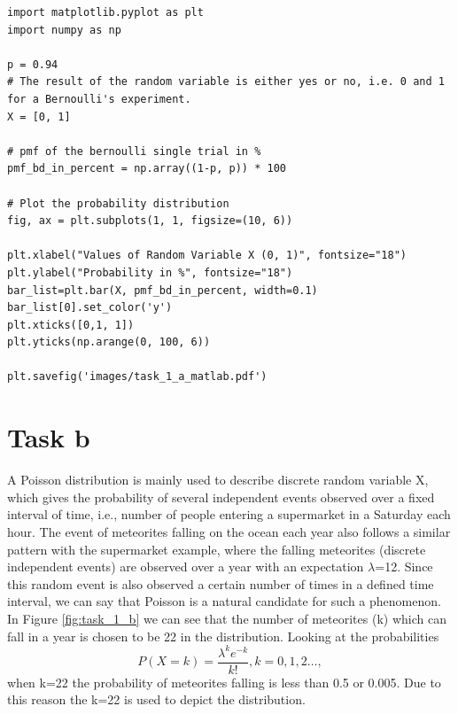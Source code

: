 \begin{lstlisting}[caption={: Plotting the PMF for representing Bernoulli’s single trial P (votes=for & votes = against)},label=code_task_1_a]
import matplotlib.pyplot as plt
import numpy as np

p = 0.94
# The result of the random variable is either yes or no, i.e. 0 and 1 for a Bernoulli's experiment.
X = [0, 1]

# pmf of the bernoulli single trial in %
pmf_bd_in_percent = np.array((1-p, p)) * 100

# Plot the probability distribution
fig, ax = plt.subplots(1, 1, figsize=(10, 6))

plt.xlabel("Values of Random Variable X (0, 1)", fontsize="18")
plt.ylabel("Probability in %", fontsize="18")
bar_list=plt.bar(X, pmf_bd_in_percent, width=0.1)
bar_list[0].set_color('y')
plt.xticks([0,1, 1])
plt.yticks(np.arange(0, 100, 6))

plt.savefig('images/task_1_a_matlab.pdf')
\end{lstlisting}

\section{Task b}

A Poisson distribution is mainly used to describe discrete random variable X, which gives the probability of several independent events observed over a fixed interval of time, i.e., number of people entering a supermarket in a Saturday each hour. \newline
The event of meteorites falling on the ocean each year also follows a similar pattern with the supermarket example, where the falling meteorites (discrete independent events) are observed over a year with an expectation ${\lambda}$=12. Since this random event is also observed a certain number of times in a defined time interval, we can say that Poisson is a natural candidate for such a phenomenon.\newline\newline
In Figure \ref{fig:task_1_b} we can see that the number of meteorites (k) which can fall in a year is chosen to be 22 in the distribution. Looking at the probabilities  \begin{equation} P(X=k)=\frac{\lambda^k e^{-k}}{k!}, k=0,1,2…,  \label{pmf_poission}\end{equation} when k=22 the probability of meteorites falling is less than 0.5 or 0.005. Due to this reason the k=22 is used to depict the distribution. 

